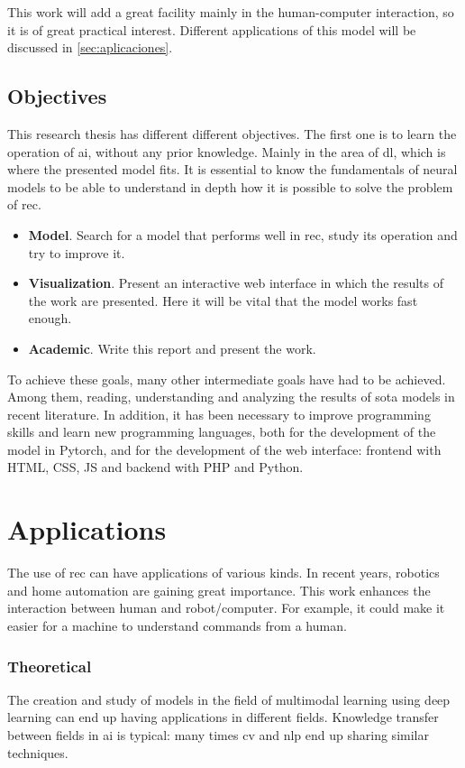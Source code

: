 This work will add a great facility mainly in the human-computer interaction,
so it is of great practical interest. Different applications of this model will
be discussed in \vref{sec:aplicaciones}.

\subsection{Objectives}

This research thesis has different different objectives. The first one is to
learn the operation of \gls{ai}, without any prior knowledge. Mainly in the
area of \gls{dl}, which is where the presented model fits. It is essential to
know the fundamentals of neural models to be able to understand in depth how it
is possible to solve the problem of \gls{rec}.

\begin{itemize}
  \item \textbf{Model}. Search for a model that performs well in \gls{rec},
  study its operation and try to improve it.
  \item \textbf{Visualization}. Present an interactive web interface in which
  the results of the work are presented. Here it will be vital that the model
  works fast enough.
  \item \textbf{Academic}. Write this report and present the work.
\end{itemize}

To achieve these goals, many other intermediate goals have had to be
achieved. Among them, reading, understanding and analyzing the results of
\gls{sota} models in recent literature. In addition, it has been necessary to
improve programming skills and learn new programming languages, both for the
development of the model in Pytorch, and for the development of the web
interface: frontend with HTML, CSS, JS and backend with PHP and Python.


\section{Applications}\label{sec:aplicaciones}

The use of \gls{rec} can have applications of various kinds. In recent years,
robotics and home automation are gaining great importance. This work enhances
the interaction between human and robot/computer. For example, it could make it
easier for a machine to understand commands from a human.

\subsubsection{Theoretical}
The creation and study of models in the field of multimodal
learning using deep learning can end up having
applications in different fields. Knowledge transfer between fields in \gls{ai}
is typical: many times \gls{cv} and \gls{nlp} end up sharing similar
techniques.

